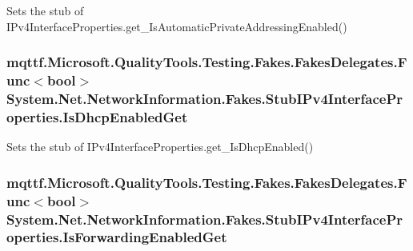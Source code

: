 Sets the stub of I\-Pv4\-Interface\-Properties.\-get\-\_\-\-Is\-Automatic\-Private\-Addressing\-Enabled()

\hypertarget{class_system_1_1_net_1_1_network_information_1_1_fakes_1_1_stub_i_pv4_interface_properties_a334a286409d2b777ed38a0444e7c01d8}{
\subsubsection[{Is\-Dhcp\-Enabled\-Get}]{\setlength{\rightskip}{0pt plus 5cm}mqttf.\-Microsoft.\-Quality\-Tools.\-Testing.\-Fakes.\-Fakes\-Delegates.\-Func$<$bool$>$ System.\-Net.\-Network\-Information.\-Fakes.\-Stub\-I\-Pv4\-Interface\-Properties.\-Is\-Dhcp\-Enabled\-Get}}\label{class_system_1_1_net_1_1_network_information_1_1_fakes_1_1_stub_i_pv4_interface_properties_a334a286409d2b777ed38a0444e7c01d8}


Sets the stub of I\-Pv4\-Interface\-Properties.\-get\-\_\-\-Is\-Dhcp\-Enabled()

\hypertarget{class_system_1_1_net_1_1_network_information_1_1_fakes_1_1_stub_i_pv4_interface_properties_a9afeaa06ad4e2643362836b1352d1dbe}{
\subsubsection[{Is\-Forwarding\-Enabled\-Get}]{\setlength{\rightskip}{0pt plus 5cm}mqttf.\-Microsoft.\-Quality\-Tools.\-Testing.\-Fakes.\-Fakes\-Delegates.\-Func$<$bool$>$ System.\-Net.\-Network\-Information.\-Fakes.\-Stub\-I\-Pv4\-Interface\-Properties.\-Is\-Forwarding\-Enabled\-Get}}\label{class_system_1_1_net_1_1_network_information_1_1_fakes_1_1_stub_i_pv4_interface_properties_a9afeaa06ad4e2643362836b1352d1dbe}


